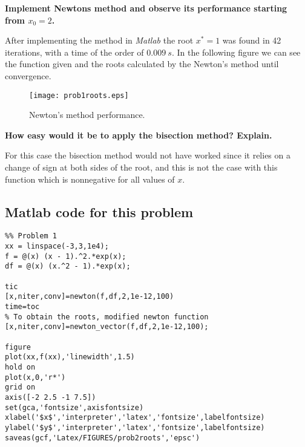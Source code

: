 \vspace{0.3in}

\textbf{Implement Newtons method and observe its performance starting from $x_0 = 2$.}

\vspace{0.3in}

After implementing the method in \textsl{Matlab} the root $x^*=1$ was found in 42 iterations, with a time of the order of $0.009~s$. In the following figure we can see the function given and the roots calculated by the Newton's method until convergence.

\begin{figure}[H]
\centering     %
{\texttt{[image: prob1roots.eps]}}
\caption{Newton's method performance.}
\end{figure}

\vspace{0.3in}

\textbf{How easy would it be to apply the bisection method? Explain.}

\vspace{0.3in}

For this case the bisection method would not have worked since it relies on a change of sign at both sides of the root, and this is not the case with this function which is nonnegative for all values of $x$.

\subsection*{Matlab code for this problem}
\begin{verbatim}
%% Problem 1
xx = linspace(-3,3,1e4);
f = @(x) (x - 1).^2.*exp(x);
df = @(x) (x.^2 - 1).*exp(x);

tic
[x,niter,conv]=newton(f,df,2,1e-12,100)
time=toc
% To obtain the roots, modified newton function
[x,niter,conv]=newton_vector(f,df,2,1e-12,100);

figure
plot(xx,f(xx),'linewidth',1.5)
hold on
plot(x,0,'r*')
grid on
axis([-2 2.5 -1 7.5])
set(gca,'fontsize',axisfontsize)
xlabel('$x$','interpreter','latex','fontsize',labelfontsize)
ylabel('$y$','interpreter','latex','fontsize',labelfontsize)
saveas(gcf,'Latex/FIGURES/prob2roots','epsc')
\end{verbatim}